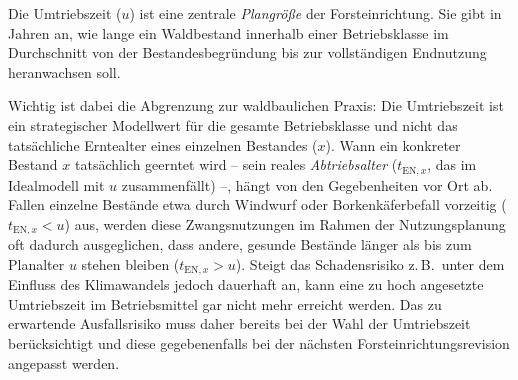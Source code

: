 \documentclass[twocolumn, paper=a4, fontsize=10pt]{scrartcl}
\begin{document}
Die Umtriebszeit ($u$) ist eine zentrale \emph{Plangröße} der Forsteinrichtung. Sie gibt in Jahren an, wie lange ein Waldbestand innerhalb einer Betriebsklasse im Durchschnitt von der Bestandesbegründung bis zur vollständigen Endnutzung heranwachsen soll.

Wichtig ist dabei die Abgrenzung zur waldbaulichen Praxis: Die Umtriebszeit ist ein strategischer Modellwert für die gesamte Betriebsklasse und nicht das tatsächliche Erntealter eines einzelnen Bestandes ($x$). Wann ein konkreter Bestand $x$ tatsächlich geerntet wird -- sein reales \emph{Abtriebsalter} ($t_{\text{EN},x}$, das im Idealmodell mit $u$ zusammenfällt) --, hängt von den Gegebenheiten vor Ort ab. Fallen einzelne Bestände etwa durch Windwurf oder Borkenkäferbefall vorzeitig ($t_{\text{EN},x} < u$) aus, werden diese Zwangsnutzungen im Rahmen der Nutzungsplanung oft dadurch ausgeglichen, dass andere, gesunde Bestände länger als bis zum Planalter $u$ stehen bleiben ($t_{\text{EN},x} > u$). Steigt das Schadensrisiko z.\,B.\ unter dem Einfluss des Klimawandels jedoch dauerhaft an, kann eine zu hoch angesetzte Umtriebszeit im Betriebsmittel gar nicht mehr erreicht werden. Das zu erwartende Ausfallsrisiko muss daher bereits bei der Wahl der Umtriebszeit berücksichtigt und diese gegebenenfalls bei der nächsten Forsteinrichtungsrevision angepasst werden.
\end{document}

